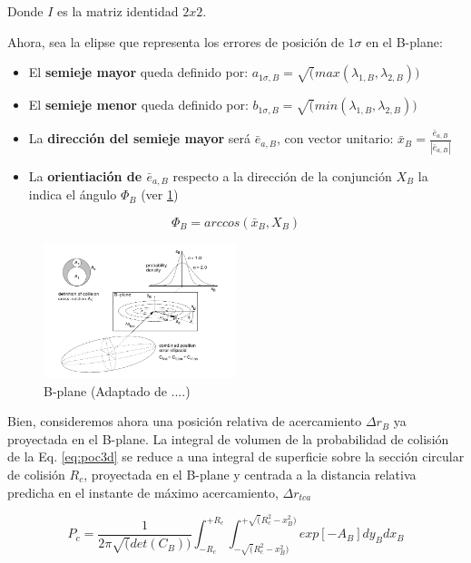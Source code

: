 Donde $I$ es la matriz identidad $2x2$.

Ahora, sea la elipse que representa los errores de posici\'on de $1\sigma$ en el B-plane:\\

\begin{itemize}
 \item El {\bf{semieje mayor}} queda definido por: $a_{1\sigma,B}=\sqrt(max(\lambda_{1,B},\lambda_{2,B}))$
 \item El {\bf{semieje menor}} queda definido por: $b_{1\sigma,B}=\sqrt(min(\lambda_{1,B},\lambda_{2,B}))$
 \item La {\bf{direcci\'on del semieje mayor}} ser\'a $\bar{e}_{a,B}$, con vector unitario: $ \bar{x}_{B}=\frac{\bar{e}_{a,B}}{|\bar{e}_{a,B}|}$ 
 \item La {\bf{orientiaci\'on de $\bar{e}_{a,B}$}} respecto a la direcci\'on de la conjunci\'on $X_{B}$ la indica el \'angulo $\Phi_{B}$ (ver \ref{fig:bplane})
\end{itemize}

\begin{equation}
 \Phi_{B}= arccos(\bar{x}_{B},X_{B})
\end{equation}

\begin{figure}[!h]
\centering
 \includegraphics[width=0.5\textwidth]{imagenes/akellabplane}
 \caption{ B-plane (Adaptado de ....)}
 \label{fig:bplane}
\end{figure}

Bien, consideremos ahora una posici\'on relativa de acercamiento $\Delta r_{B}$ ya proyectada en el B-plane. La integral de volumen de la probabilidad de colisi\'on de la Eq. \ref{eq:poc3d} se reduce a una integral de superficie sobre la secci\'on circular de colisi\'on $R_{c}$, proyectada en el B-plane y centrada a la distancia relativa predicha en el instante de m\'aximo acercamiento, $\Delta r_{tca}$

\begin{equation}
P_{c} = \frac{1}{2 \pi \sqrt(det(C_{B}))} \int_{-R_{c}}^{+R_{c}} \int_{-\sqrt(R^{2}_{c}-x^{2}_{B})}^{+\sqrt(R^{2}_{c}-x^{2}_{B})} exp [- A_{B}] dy_{B} dx_{B}
\end{equation}

